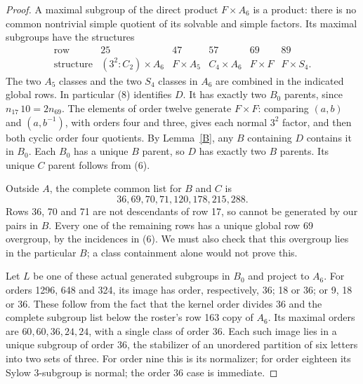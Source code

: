 \documentclass[11pt,a4paper]{article}
\begin{document}
\begin{proof}
A maximal subgroup of the direct product $F\times A_6$ is a product:
there is no common nontrivial simple quotient of its solvable and
simple factors. Its maximal subgroups have the structures
\[
\begin{array}{c|ccccc}
\text{row}&25&47&57&69&89\\\hline
\text{structure}&(3^2:C_2)\times A_6&F\times A_5&C_4\times A_6&
F\times F&F\times S_4.
\end{array}                                                  \tag{8}
\]
The two $A_5$ classes and the two $S_4$ classes in $A_6$ are combined
in the indicated global rows. In particular (8) identifies $D$.
It has exactly two $B_0$ parents, since $n_{17}\,10=2n_{69}$.
The elements of order twelve generate $F\times F$: comparing
$(a,b)$ and $(a,b^{-1})$, with orders four and three, gives each
normal $3^2$ factor, and then both cyclic order four quotients.
By Lemma~\ref{B}, any $B$ containing $D$ contains it in $B_0$.
Each $B_0$ has a unique $B$ parent, so $D$ has exactly two $B$ parents.
Its unique $C$ parent follows from (6).

Outside $A$, the complete common list for $B$ and $C$ is
\[
           36,69,70,71,120,178,215,288.                       \tag{9}
\]
Rows 36, 70 and 71 are not descendants of row 17, so cannot be
generated by our pairs in $B$. Every one of the remaining rows has
a unique global row 69 overgroup, by the incidences in (6).
We must also check that this overgroup lies in the particular $B$;
a class containment alone would not prove this.

Let $L$ be one of these actual generated subgroups in $B_0$ and
project to $A_6$. For orders 1296, 648 and 324, its image has order,
respectively, 36; 18 or 36; or 9, 18 or 36. These follow from the fact that the kernel order divides 36 and
the complete subgroup list below the roster's row 163 copy of $A_6$.
Its maximal orders are $60,60,36,24,24$, with a single class of order 36.
Each such image lies in a unique subgroup of order 36, the stabilizer
of an unordered partition of six letters into two sets of three.
For order nine this is its normalizer; for order eighteen its Sylow
3-subgroup is normal; the order 36 case is immediate.


\end{proof}
\end{document}
